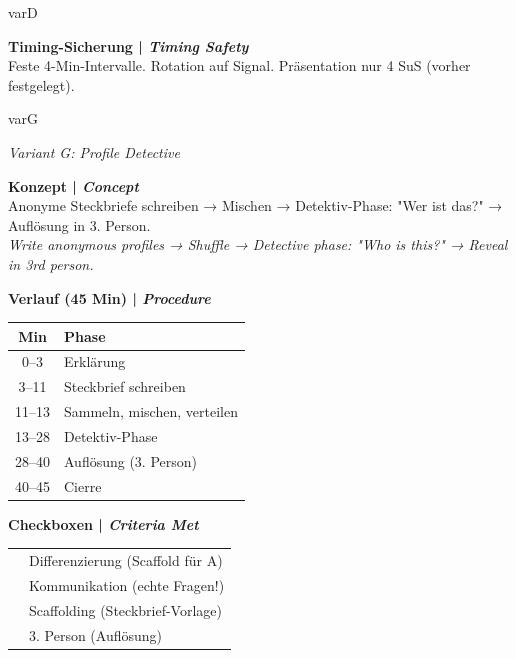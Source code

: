 \documentclass[11pt, a4paper]{article}
\newcommand{\en}[1]{{\small\color{english}\textit{#1}}}
\newcommand{\cmark}{\textcolor{success}{\ding{51}}}
\newcommand{\risikoniedrig}{\colorbox{success!20}{\textcolor{success}{\scriptsize\textbf{NIEDRIG}}}}
\newcommand{\score}[1]{\colorbox{spanisch!15}{\textcolor{spanisch}{\textbf{#1/10}}}}
\begin{document}
\begin{varbox}[title={\textcolor{varD}{VARIANTE D: Kugellager (Doppelkreis)} \hfill \score{9.3} \risikoniedrig}]{varD}
\begin{minipage}[t]{0.48\textwidth}
\vspace{0.2cm}

\textbf{Timing-Sicherung | \en{Timing Safety}}\\[0.1cm]
Feste 4-Min-Intervalle. Rotation auf Signal. Präsentation nur 4 SuS (vorher festgelegt).
\end{minipage}

\end{varbox}

\vspace{0.4cm}


\begin{varbox}[title={\textcolor{varG}{VARIANTE G: Steckbrief-Detektiv} \hfill \score{9.4} \risikoniedrig}]{varG}

\en{Variant G: Profile Detective}

\vspace{0.2cm}

\begin{minipage}[t]{0.48\textwidth}
\textbf{Konzept | \en{Concept}}\\[0.1cm]
Anonyme Steckbriefe schreiben → Mischen → Detektiv-Phase: "Wer ist das?" → Auflösung in 3. Person.\\[0.1cm]
\en{Write anonymous profiles → Shuffle → Detective phase: "Who is this?" → Reveal in 3rd person.}

\vspace{0.3cm}

\textbf{Verlauf (45 Min) | \en{Procedure}}\\[0.1cm]
\small
\begin{tabular}{|c|l|}
\hline
\rowcolor{varG!10}
\textbf{Min} & \textbf{Phase} \\
\hline
0--3 & Erklärung \\
3--11 & Steckbrief schreiben \\
11--13 & Sammeln, mischen, verteilen \\
13--28 & Detektiv-Phase \\
28--40 & Auflösung (3. Person) \\
40--45 & Cierre \\
\hline
\end{tabular}
\end{minipage}
\hfill
\begin{minipage}[t]{0.48\textwidth}
\textbf{Checkboxen | \en{Criteria Met}}\\[0.1cm]
\begin{tabular}{ll}
\cmark & Differenzierung (Scaffold für A) \\
\cmark & Kommunikation (echte Fragen!) \\
\cmark & Scaffolding (Steckbrief-Vorlage) \\
\cmark & 3. Person (Auflösung) \\
\end{tabular}


\end{minipage}
\end{varbox}
\end{document}
